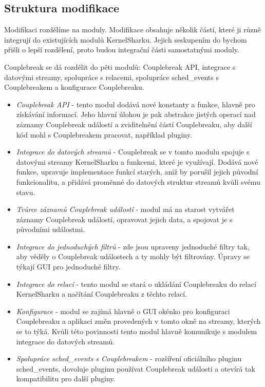 \subsection{Struktura modifikace}

Modifikaci rozdělíme na moduly. Modifikace obsahuje několik částí, které ji různě integrují do existujících modulů KernelSharku. Jejich seskupením do  bychom přišli o lepší rozdělení, proto budou integrační části samostatnými moduly.

Couplebreak se dá rozdělit do pěti modulů: Couplebreak API, integrace s datovými streamy, spolupráce s relacemi, spolupráce sched\_events s Couplebreakem a konfigurace Couplebreaku. 

\begin{itemize}
    \item \emph{Couplebreak API} - tento modul dodává nové konstanty a funkce, hlavně pro získávání informací. Jeho hlavní úlohou je pak abstrakce jistých operací nad záznamy Couplebreak událostí a zviditelnění částí Couplebreaku, aby další kód mohl s Couplebreakem pracovat, například pluginy.
    
    \item \emph{Integrace do datových streamů} - Couplebreak se v tomto modulu spojuje s datovými streamy KernelSharku a funkcemi, které je využívají. Dodává nové funkce, upravuje implementace funkcí starých, aniž by porušil jejich původní funkcionalitu, a přidává proměnné do datových struktur streamů kvůli svému stavu.

    \item \emph{Tvůrce záznamů Couplebreak událostí} - modul má na starost vytvářet záznamy Couplebreak událostí, opravovat jejich data, a spojovat je s původními událostmi.

    \item \emph{Integrace do jednoduchých filtrů} - zde jsou upraveny jednoduché filtry tak, aby věděly o Couplebreak událostech a ty mohly být filtrovány. Úpravy se týkají GUI pro jednoduché filtry.

    \item \emph{Integrace do relací} - tento modul se stará o ukládání Couplebreaku do relací KernelSharku a načítání Couplebreaku z těchto relací.

    \item \emph{Konfigurace} - modul se zajímá hlavně o GUI okénko pro konfiguraci Couplebreaku a aplikaci změn provedených v tomto okně na streamy, kterých se to týká. Kvůli této povinnosti tento modul hlavně komunikuje s modulem integrace do datových streamů.
    
    \item \emph{Spolupráce sched\_events s Couplebreakem} - rozšíření oficiálního pluginu sched\_events, dovoluje pluginu používat Couplebreak události a otevírá tak kompatibilitu pro další pluginy.
\end{itemize}

